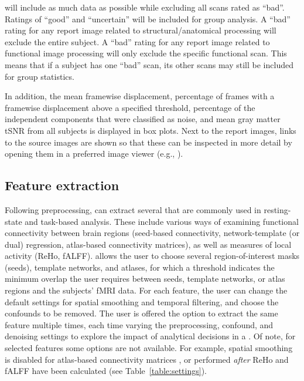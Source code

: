  will include as much data as possible while excluding all
scans rated as ``bad''. Ratings of ``good'' and ``uncertain'' will be
included for group analysis. A ``bad'' rating for any report image related
to structural/anatomical processing will exclude the entire subject. A 
``bad'' rating for any report image related to functional image processing
will only exclude the specific functional scan. This means that if a
subject has one ``bad'' scan, its other scans may still be included for
group statistics.

In addition, the mean framewise displacement, percentage of frames with a
framewise displacement above a specified threshold, percentage of the
independent components that were classified as noise, and mean gray matter
tSNR from all subjects is displayed in box plots. Next to the report
images, links to the source images are shown so that these can be inspected
in more detail by opening them in a preferred image viewer (e.g.,
).

\subsection{Feature extraction}\label{sec:featureextraction}

Following preprocessing,  can extract several
 that are commonly used in resting-state and task-based
analysis. These include various ways of examining functional connectivity
between brain regions (seed-based connectivity, network-template (or dual)
regression, atlas-based connectivity matrices), as well as measures of
local activity (ReHo, fALFF).  allows the user to choose
several region-of-interest masks (seeds), template networks, and atlases,
for which a threshold indicates the minimum overlap the user requires
between seeds, template networks, or atlas regions and the subjects' fMRI
data. For each feature, the user can change the default settings for
spatial smoothing and temporal filtering, and choose the confounds to be
removed. The user is offered the option to extract the same feature
multiple times, each time varying the preprocessing, confound, and
denoising settings to explore the impact of analytical decisions in a
. Of note, for selected features some options are
not available. For example, spatial smoothing is disabled for atlas-based
connectivity matrices \parencite{10.1111/ejn.13717}, or performed \emph{after}
ReHo and fALFF have been calculated (see Table~\ref{table:settings}).

